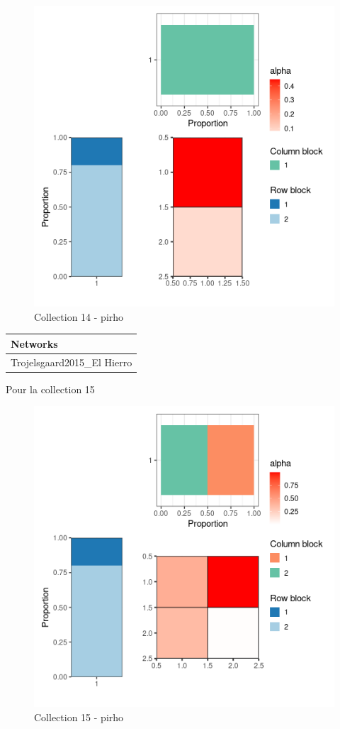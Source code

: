 \begin{figure}
\centering
\includegraphics{figure/pirho_meso_plot-14.png}
\caption{Collection 14 - pirho}
\end{figure}

\begin{longtable}[]{@{}l@{}}
\toprule
Networks\tabularnewline
\midrule
\endhead
Trojelsgaard2015\_El Hierro\tabularnewline
\bottomrule
\end{longtable}

Pour la collection 15

\begin{figure}
\centering
\includegraphics{figure/pirho_meso_plot-15.png}
\caption{Collection 15 - pirho}
\end{figure}

